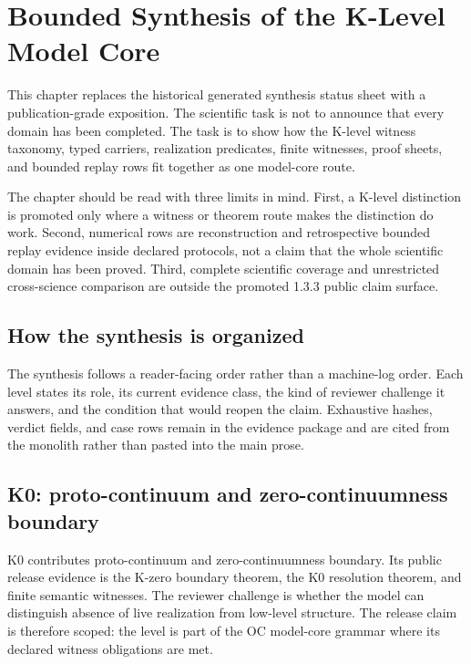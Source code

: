 \section{Bounded Synthesis of the K-Level Model Core}

\label{sec:oc-core-1-3-unified-synthesis}

This chapter replaces the historical generated synthesis status sheet with a publication-grade exposition. The scientific task is not to announce that every domain has been completed. The task is to show how the K-level witness taxonomy, typed carriers, realization predicates, finite witnesses, proof sheets, and bounded replay rows fit together as one model-core route.


The chapter should be read with three limits in mind. First, a K-level distinction is promoted only where a witness or theorem route makes the distinction do work. Second, numerical rows are reconstruction and retrospective bounded replay evidence inside declared protocols, not a claim that the whole scientific domain has been proved. Third, complete scientific coverage and unrestricted cross-science comparison are outside the promoted 1.3.3 public claim surface.


\subsection{How the synthesis is organized}

The synthesis follows a reader-facing order rather than a machine-log order. Each level states its role, its current evidence class, the kind of reviewer challenge it answers, and the condition that would reopen the claim. Exhaustive hashes, verdict fields, and case rows remain in the evidence package and are cited from the monolith rather than pasted into the main prose.


\subsection{K0: proto-continuum and zero-continuumness boundary}

K0 contributes proto-continuum and zero-continuumness boundary. Its public release evidence is the K-zero boundary theorem, the K0 resolution theorem, and finite semantic witnesses. The reviewer challenge is whether the model can distinguish absence of live realization from low-level structure. The release claim is therefore scoped: the level is part of the OC model-core grammar where its declared witness obligations are met.



